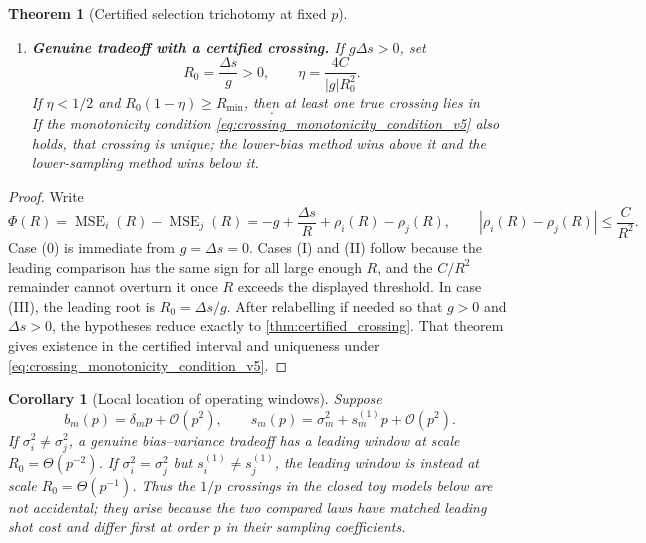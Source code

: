 \documentclass[11pt]{article}
\newtheorem{theorem}{Theorem}
\newtheorem{corollary}{Corollary}
\newcommand{\MSE}{\operatorname{MSE}}
\newcommand{\1}{\mathbf{1}}
\newcommand{\OO}{\mathcal{O}}
\newcommand{\abs}[1]{\left\lvert #1 \right\rvert}
\begin{document}
\begin{theorem}[Certified selection trichotomy at fixed \(p\)]
\begin{enumerate}[leftmargin=2.2em]
\item[\textnormal{(III)}] \textbf{Genuine tradeoff with a certified crossing.}  If \(g\Delta s>0\), set
\begin{equation}
    R_0=\frac{\Delta s}{g}>0,
    \qquad
    \eta=\frac{4C}{\abs g R_0^2}.
\end{equation}
If \(\eta<1/2\) and \(R_0(1-\eta)\ge R_{\min}\), then at least one true crossing lies in
\begin{equation}
    [R_0(1-\eta),R_0(1+\eta)].
\end{equation}
If the monotonicity condition \cref{eq:crossing_monotonicity_condition_v5} also holds, that crossing is unique; the lower-bias method wins above it and the lower-sampling method wins below it.
\end{enumerate}
\end{theorem}

\begin{proof}
Write
\begin{equation}
    \Phi(R)=\MSE_i(R)-\MSE_j(R)=-g+\frac{\Delta s}{R}+\rho_i(R)-\rho_j(R),
    \qquad
    \abs{\rho_i(R)-\rho_j(R)}\le\frac{C}{R^2}.
\end{equation}
Case (0) is immediate from \(g=\Delta s=0\).  Cases (I) and (II) follow because the leading comparison has the same sign for all large enough \(R\), and the \(C/R^2\) remainder cannot overturn it once \(R\) exceeds the displayed threshold.  In case (III), the leading root is \(R_0=\Delta s/g\).  After relabelling if needed so that \(g>0\) and \(\Delta s>0\), the hypotheses reduce exactly to \cref{thm:certified_crossing}.  That theorem gives existence in the certified interval and uniqueness under \cref{eq:crossing_monotonicity_condition_v5}.
\end{proof}

\begin{corollary}[Local location of operating windows]
\label{cor:window_location_v10}
Suppose
\begin{equation}
    b_m(p)=\delta_m p+\OO(p^2),
    \qquad
    s_m(p)=\sigma_m^2+s_m^{(1)}p+\OO(p^2).
\end{equation}
If \(\sigma_i^2\ne\sigma_j^2\), a genuine bias--variance tradeoff has a leading window at scale \(R_0=\Theta(p^{-2})\).  If \(\sigma_i^2=\sigma_j^2\) but \(s_i^{(1)}\ne s_j^{(1)}\), the leading window is instead at scale \(R_0=\Theta(p^{-1})\).  Thus the \(1/p\) crossings in the closed toy models below are not accidental; they arise because the two compared laws have matched leading shot cost and differ first at order \(p\) in their sampling coefficients.
\end{corollary}
\end{document}
